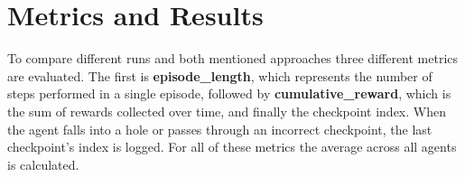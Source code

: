 
\section{Metrics and Results}\label{sec:metrics-and-results}
To compare different runs and both mentioned approaches three different metrics are evaluated.
The first is \textbf{episode\_length}, which represents the number of steps performed in a single episode, followed by \textbf{cumulative\_reward}, which is the sum of rewards collected over time, and finally the checkpoint index.
When the agent falls into a hole or passes through an incorrect checkpoint, the last checkpoint's index is logged.
For all of these metrics the average across all agents is calculated.